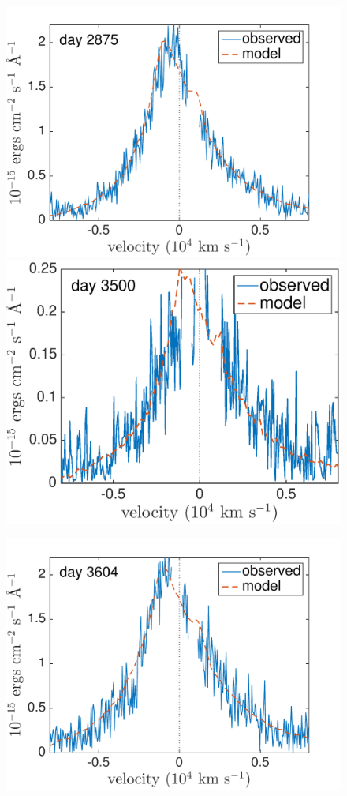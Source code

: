 \begin{figure}
\includegraphics[trim =0 35 20 0 ,clip=true,scale=0.39]{chapters/chapter5/images/clump_1/best_fit/d2875Ha.pdf}
\includegraphics[trim =0 35 20 0,clip=true,scale=0.39]{chapters/chapter5/images/clump_1/best_fit/d3500Ha}

\includegraphics[trim =0 0 20 0,clip=true,scale=0.39]{chapters/chapter5/images/clump_1/best_fit/d3604Ha.pdf}


\end{figure}
